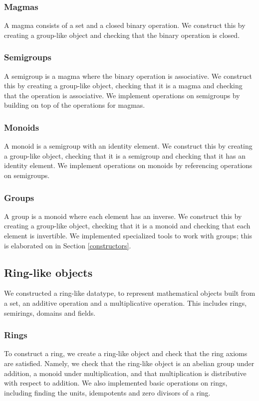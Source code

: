 \documentclass{article}
\begin{document}
		\subsubsection{Magmas}
			A magma consists of a set and a closed binary operation. We construct this by creating a group-like object and checking that the binary operation is closed.

		\subsubsection{Semigroups}
			A semigroup is a magma where the binary operation is associative. We construct this by creating a group-like object, checking that it is a magma and checking that the operation is associative. We implement operations on semigroups by building on top of the operations for magmas.

		\subsubsection{Monoids}
			A monoid is a semigroup with an identity element. We construct this by creating a group-like object, checking that it is a semigroup and checking that it has an identity element. We implement operations on monoids by referencing operations on semigroups.

		\subsubsection{Groups}
			A group is a monoid where each element has an inverse. We construct this by creating a group-like object, checking that it is a monoid and checking that each element is invertible. We implemented specialized tools to work with groups; this is elaborated on in Section \ref{constructors}.
        
        \subsection{Ring-like objects}
		We constructed a ring-like datatype, to represent mathematical objects built from a set, an additive operation and a multiplicative operation. This includes rings, semirings, domains and fields. 

		\subsubsection{Rings}
			To construct a ring, we create a ring-like object and check that the ring axioms are satisfied. Namely, we check that the ring-like object is an abelian group under addition, a monoid under multiplication, and that multiplication is distributive with respect to addition. We also implemented basic operations on rings, including finding the units, idempotents and zero divisors of a ring. 
\end{document}
